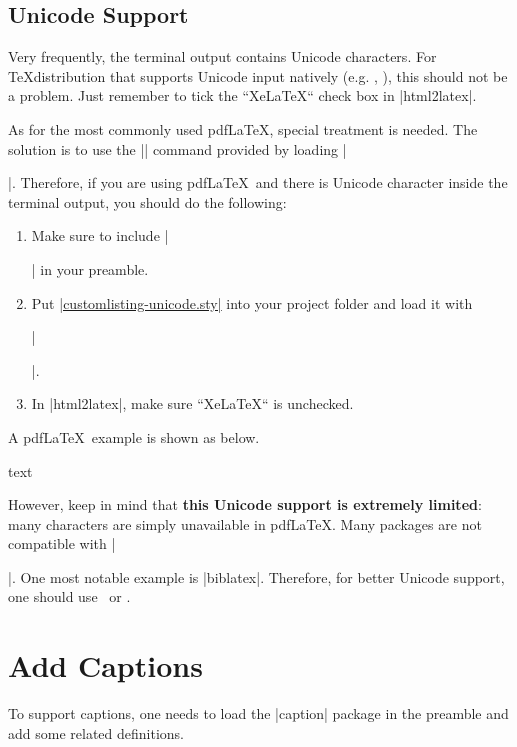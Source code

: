 \documentclass[letterpaper, 11pt, DIV=11]{scrartcl}
\begin{document}
\subsection{Unicode Support}

Very frequently, the terminal output contains Unicode characters. For \TeX distribution that supports Unicode input natively (e.g. \XeLaTeX, \LuaLaTeX), this should not be a problem. Just remember to tick the ``XeLaTeX`` check box in \rawinline|html2latex|.


As for the most commonly used pdf\LaTeX, special treatment is needed. The solution is to use the \texinline|\unichar| command provided by loading \texinline|\usepackage[utf8x]{inputenc}|. Therefore, if you are using pdf\LaTeX\ and there is Unicode character inside the terminal output, you should do the following:

\begin{enumerate}
\item Make sure to include \texinline|\usepackage[utf8x]{inputenc}| in your preamble.
\item Put \href{https://github.com/xziyue/latex-beautiful-listings-screenshot/blob/master/customlisting-unicode.sty}{\rawinline|customlisting-unicode.sty|} into your project folder and load it with 

\texinline|\usepackage{customlisting-unicode}|.
\item In \rawinline|html2latex|, make sure ``XeLaTeX`` is unchecked.
\end{enumerate}

A pdf\LaTeX\ example is shown as below. 

\begin{tcbsrccode}{text}

\end{tcbsrccode}


However, keep in mind that \textbf{this Unicode support is extremely limited}: many characters are simply unavailable in pdf\LaTeX. Many packages are not compatible with \texinline|\usepackage[utf8x]{inputenc}|. One most notable example is \rawinline|biblatex|. Therefore, for better Unicode support, one should use \XeLaTeX\ or \LuaLaTeX.

\section{Add Captions}

To support captions, one needs to load the \rawinline|caption| package in the preamble and add some related definitions. 
\end{document}
